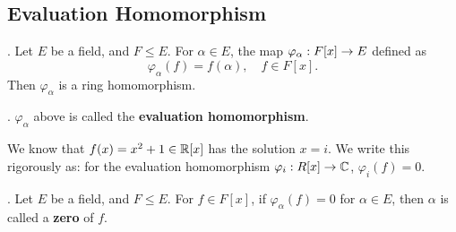 \subsection*{Evaluation Homomorphism}

\thm. Let \(E\) be a field, and \(F \leq E\). For \(\alpha \in E\), the map \(\varphi_\alpha : F[x] \rightarrow E\) defined as
\[
    \varphi_\alpha(f) = f(\alpha), \quad f \in F[x].
\]
Then \(\varphi_\alpha\) is a ring homomorphism.

.  \(\varphi_\alpha\) above is called the \textbf{evaluation homomorphism}.

\rmk We know that \(f(x) = x^2 + 1 \in \mathbb{R}[x]\) has the solution \(x = i\). We write this rigorously as: for the evaluation homomorphism \(\varphi_i : R[x] \rightarrow \mathbb{C}\), \(\varphi_i(f) = 0\).

.  Let \(E\) be a field, and \(F \leq E\). For \(f \in F[x]\), if \(\varphi_\alpha(f) = 0\) for \(\alpha \in E\), then \(\alpha\) is called a \textbf{zero} of \(f\).

\pagebreak

